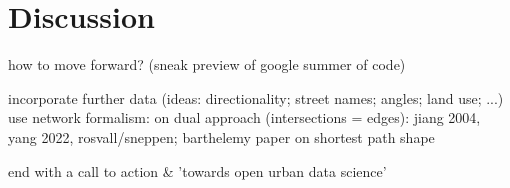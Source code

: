 \section{Discussion}
\label{sec:discussion}

how to move forward? (sneak preview of google summer of code)

incorporate further data (ideas: directionality; street names; angles; land use; ...)
use network formalism: on dual approach (intersections = edges): jiang 2004, yang 2022, rosvall/sneppen; barthelemy paper on shortest path shape

end with a call to action & 'towards open urban data science' 